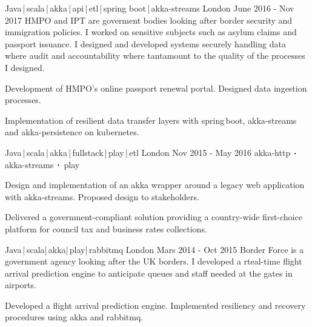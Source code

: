 \begin{cventries}
    \cventry
    {Java\,|\,scala\,|\,akka\,|\,api\,|\,etl\,|\,spring boot\,|\,akka-streams}
    {} 
    {London}
    {June 2016 - Nov 2017}
    {HMPO and IPT are goverment bodies looking after border security and immigration policies. I worked on sensitive subjects such as asylum claims and passport issuance. I designed and developed systems securely handling data where audit and accountability where tantamount to the quality of the processes I designed.}
    {
        \begin{cvitems}
            \item{Development of HMPO's online passport renewal portal. Designed data ingestion processes.}
            \item{Implementation of resilient data transfer layers with spring\,boot, akka-streams and akka-persistence on kubernetes.}
        \end{cvitems}
    }

    \cventry
    {Java\,|\,scala\,|\,akka\,|\,fullstack\,|\,play\,|\,etl}
    {} 
    {London}
    {Nov 2015 - May 2016}
    {akka-http$\sqbig$akka-streams$\sqbig$play}
    {
        \begin{cvitems}
            \item{Design and implementation of an akka wrapper around a legacy web application with akka-streams. Proposed design to stakeholders.}
            \item{Delivered a government-compliant solution providing a country-wide first-choice platform for council tax and business rates collections.}
        \end{cvitems}
    }

    \cventry
    {Java\,|\,scala|\,akka|\,play|\,rabbitmq}
    {} 
    {London}
    {Mars 2014 - Oct 2015}
    {Border Force is a government agency looking after the UK borders. I developed a rteal-time flight arrival prediction engine to anticipate queues and staff needed at the gates in airports.}
    {
        \begin{cvitems}
            \item{Developed a flight arrival prediction engine. Implemented resiliency and recovery procedures using akka and rabbitmq.}
        \end{cvitems}
    }


\end{cventries}
